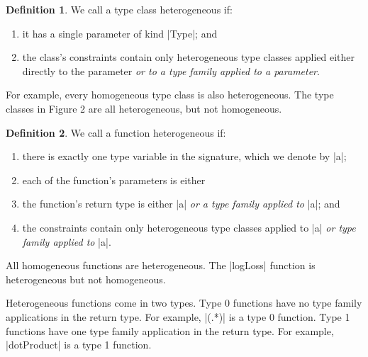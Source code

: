 \documentclass[preprint]{sigplanconf}
\theoremstyle{definition}
\newtheorem{defn}{Definition}
\begin{document}

\begin{defn}
We call a type class heterogeneous if:
\begin{enumerate}
\item
it has a single parameter of kind |Type|; and
\item
the class's constraints contain only heterogeneous type classes applied either directly to the parameter \emph{or to a type family applied to a parameter}.
\end{enumerate}
For example, every homogeneous type class is also heterogeneous.
The type classes in Figure 2 are all heterogeneous, but not homogeneous.
\end{defn}

\begin{defn}
We call a function heterogeneous if:
\begin{enumerate}
\item
there is exactly one type variable in the signature, which we denote by |a|;
\item
each of the function's parameters is either
\item
the function's return type is either |a| \emph{or a type family applied to} |a|; and
\item
the constraints contain only heterogeneous type classes applied to |a| \emph{or type family applied to} |a|.
\end{enumerate}
All homogeneous functions are heterogeneous.
The |logLoss| function is heterogeneous but not homogeneous.

Heterogeneous functions come in two types.
Type 0 functions have no type family applications in the return type.
For example, |(.*)| is a type 0 function.
Type 1 functions have one type family application in the return type.
For example, |dotProduct| is a type 1 function.
\end{defn}
\end{document}

